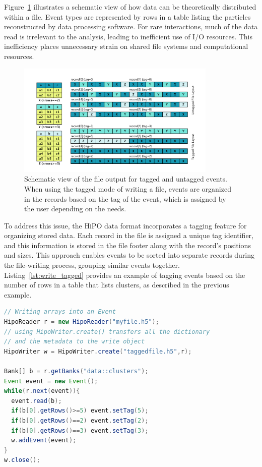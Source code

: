 \documentclass[preprint,12pt]{elsarticle}
\begin{document}
Figure~\ref{fig:event_frequency} illustrates a schematic view of how data can be theoretically distributed within a file. Event types are represented by rows in a table listing the particles reconstructed by data processing software. For rare interactions, much of the data read is irrelevant to the analysis, leading to inefficient use of I/O resources. This inefficiency places unnecessary strain on shared file systems and computational resources.

\begin{figure}[h!]
  \begin{center}
    \includegraphics[width=0.85\textwidth]{images/tagged_records.pdf}
 \end{center}
  \caption{Schematic view of the file output for tagged and untagged events. When using the tagged mode of writing a file, events are organized in the records 
  based on the tag of the event, which is assigned by the user depending on the needs.}
 \label{fig:event_frequency}
\end{figure}

To address this issue, the HiPO data format incorporates a tagging feature for organizing stored data. Each record in the file is assigned a unique tag identifier, and this information is stored in the file footer along with the record's positions and sizes. This approach enables events to be sorted into separate records during the file-writing process, grouping similar events together. Listing~\ref{lst:write_tagged} provides an example of tagging events based on the number of rows in a table that lists clusters, as described in the previous example.


\begin{lstlisting}[language=java, caption=Java example to create and write primitive types into an event, label=lst:write_tagged]
// Writing arrays into an Event
HipoReader r = new HipoReader("myfile.h5");
// using HipoWriter.create() transfers all the dictionary
// and the metadata to the write object
HipoWriter w = HipoWriter.create("taggedfile.h5",r);

Bank[] b = r.getBanks("data::clusters");
Event event = new Event();
while(r.next(event)){
  event.read(b);
  if(b[0].getRows()>=5) event.setTag(5);
  if(b[0].getRows()==2) event.setTag(2);
  if(b[0].getRows()==3) event.setTag(3);
  w.addEvent(event);
}
w.close();
\end{lstlisting}
\end{document}
